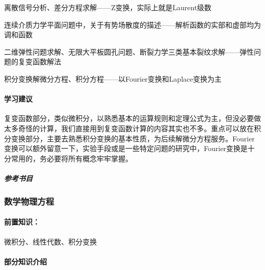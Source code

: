 离散信号分析、差分方程求解——Z变换，实际上就是Laurent级数

连续介质力学平面问题中，关于有势场散度的描述——解析函数的实部和虚部均为调和函数

二维弹性问题求解、无限大平板圆孔问题、断裂力学三类基本裂纹求解——弹性问题的复变函数解法

积分变换解微分方程、积分方程——以Fourier变换和Laplace变换为主

\paragraph{学习建议}

复变函数部分，类似微积分，以熟悉基本的运算规则和定理公式为主，但没必要做太多奇怪的计算，我们直接用到复变函数计算的内容其实也不多。重点可以放在积分变换部分，主要去熟悉积分变换的基本性质，为后续解微分方程服务。Fourier变换可以额外留意一下，实验手段或是一些特定问题的研究中，Fourier变换是十分常用的，务必要将所有概念牢牢掌握。

\subparagraph{参考书目}\mbox{}

\subsubsection{数学物理方程}

\paragraph{前置知识：}微积分、线性代数、积分变换

\paragraph{部分知识介绍}

